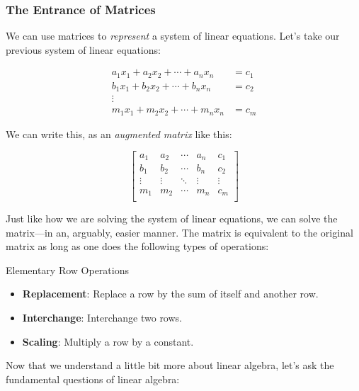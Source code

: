 \documentclass{article}
\begin{document}
\subsubsection{The Entrance of Matrices}
We can use matrices to \emph{represent} a system of linear equations. Let's take our previous system of linear equations:

\begin{equation}
	\begin{split}
		a_1x_1 + a_2x_2 + \cdots + a_nx_n & = c_1 \\
		b_1x_1 + b_2x_2 + \cdots + b_nx_n & = c_2 \\
		\vdots                            &       \\
		m_1x_1 + m_2x_2 + \cdots + m_nx_n & = c_m
	\end{split}
\end{equation}

We can write this, as an \emph{augmented matrix} like this:

\begin{equation}
	\begin{bmatrix}
		a_1    & a_2    & \cdots & a_n    & c_1    \\
		b_1    & b_2    & \cdots & b_n    & c_2    \\
		\vdots & \vdots & \ddots & \vdots & \vdots \\
		m_1    & m_2    & \cdots & m_n    & c_m    \\
	\end{bmatrix}
\end{equation}

Just like how we are solving the system of linear equations, we can solve the matrix---in an, arguably, easier manner. The matrix is equivalent to the original matrix as long as one does the following types of operations:

\begin{boxcontainer}{Elementary Row Operations}
	\begin{itemize}
		\item \textbf{Replacement}: Replace a row by the sum of itself and another row.
		\item \textbf{Interchange}: Interchange two rows.
		\item \textbf{Scaling}: Multiply a row by a constant.
	\end{itemize}
\end{boxcontainer}

Now that we understand a little bit more about linear algebra, let's ask the fundamental questions of linear algebra:
\end{document}
